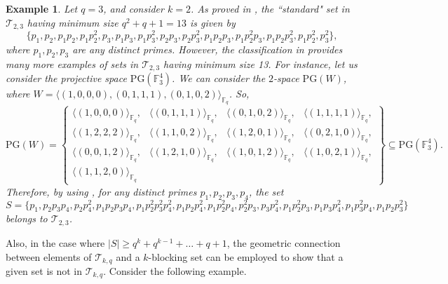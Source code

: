 \documentclass[12pt]{amsart}
\newtheorem{example}[theorem]{Example}
\newcommand{\F}{{\mathbb F}}
\newcommand{\fq}{{\mathbb F}_{q}}
\newcommand{\PG}{\mathrm{PG}}
\begin{document}
\begin{example}
Let $q=3$, and consider $k=2$. As proved in , the ``standard" set in $\mathcal{T}_{2,3}$ having minimum size $q^2+q+1=13$ is given by 
\[
\{p_1,p_2,p_1p_2,p_1p_2^2,p_3,p_1p_3,p_1p_3^2,p_2p_3,p_2p_3^2,p_1p_2p_3,p_1p_2^2p_3,p_1p_2p_3^2,p_1p_2^2,p_3^2\},
\]
where $p_1,p_2,p_3$ are any distinct primes. However, the classification in  provides many more examples of sets in $\mathcal{T}_{2,3}$ having minimum size 13. For instance, let us consider the projective space $\PG(\F_3^4)$. We can consider the $2$-space $\PG(W)$, where $W=\langle (1,0,0,0), (0,1,1,1), (0,1,0,2) \rangle_{\F_q}$. 
So,
\[
\PG(W)=\left\{ \begin{array}{cccc}
     \langle (1,0, 0,0) \rangle_{\fq}, & \langle (0,1,1,1)\rangle_{\fq}, &\langle (0, 1,0, 2) \rangle_{\fq}, & \langle (1,1,1,1)\rangle_{\fq}, \\
     \langle (1, 2, 2,2) \rangle_{\fq},  &
\langle (1,1, 0,2) \rangle_{\fq}, & \langle (1,2,0,1)\rangle_{\fq}, & \langle (0,2,1,0)\rangle_{\fq}, \\ \langle (0, 0,1, 2) \rangle_{\fq}, &\langle (1, 2, 1,0) \rangle_{\fq}, &
\langle (1,0, 1,2) \rangle_{\fq}, & \langle (1,0,2,1)\rangle_{\fq},  \\
\langle (1,1,2,0)\rangle_{\fq} &&&
\end{array}\right\} \subseteq \PG(\F_3^4).
\]
Therefore, by using , for any distinct primes $p_1,p_2,p_3,p_4$, the set
\[
S=\{p_1,p_2p_3p_4,p_2p_4^2,p_1p_2p_3p_4,p_1p_2^2p_3^2p_4^2,p_1p_2p_4^2,p_1p_2^2p_4,p_2^2p_3,p_3p_4^2,p_1p_2^2p_3,p_1p_3p_4^2,p_1p_3^2p_4,p_1p_2p_3^2\}
\] 
belongs to $\mathcal{T}_{2,3}$.
\end{example}


Also, in the case where $\lvert S \rvert \geq q^{k} + q^{k-1} + \ldots + q + 1$, the geometric connection between elements of $\mathcal{T}_{k,q}$ and a $k$-blocking set can be employed to show that a given set is not in $\mathcal{T}_{k,q}$. Consider the following example.
\end{document}

